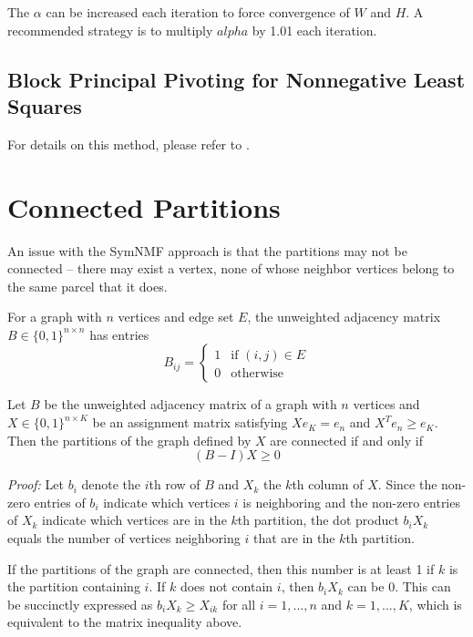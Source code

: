 The $\alpha$ can be increased each iteration to force convergence of
$W$ and $H$. A recommended strategy is to multiply $alpha$ by 1.01 each
iteration.

\subsection{Block Principal Pivoting for Nonnegative Least Squares}
For details on this method, please refer to \cite{Kim:11}.

\section{Connected Partitions}

An issue with the SymNMF approach is that the partitions may not be
connected -- there may exist a vertex, none of whose neighbor vertices
belong to the same parcel that it does.

\begin{definition}
For a graph with $n$ vertices and edge set $E$, the unweighted adjacency
matrix $B \in \{0, 1\}^{n \times n}$ has entries
\[ B_{ij} = \begin{cases}
  1 & \text{if } (i,j) \in E \\
  0 & \text{otherwise}
\end{cases}\]
\end{definition}

\begin{prop} \label{connected}
Let $B$ be the unweighted adjacency matrix of a graph with $n$ vertices
and $X \in \{0, 1\}^{n \times K}$ be an assignment matrix satisfying
$X e_K = e_n$ and $X^T e_n \geq e_K$. Then the partitions of the graph
defined by $X$ are connected if and only if
\[ (B - I) X \geq 0 \]

\textit{Proof:} Let $b_i$ denote the $i$th row of $B$ and $X_k$ the
$k$th column of $X$. Since the non-zero entries of $b_i$ indicate
which vertices $i$ is neighboring and the non-zero entries of $X_k$
indicate which vertices are in the $k$th partition, the dot product
$b_i X_k$ equals the number of vertices neighboring $i$ that are in the
$k$th partition.

If the partitions of the graph are connected, then this number is
at least 1 if $k$ is the partition containing $i$. If $k$ does not
contain $i$, then $b_i X_k$ can be 0. This can be succinctly expressed
as $b_i X_k \geq X_{ik}$ for all $i = 1, ..., n$ and $k = 1, ..., K$,
which is equivalent to the matrix inequality above.
\end{prop}

